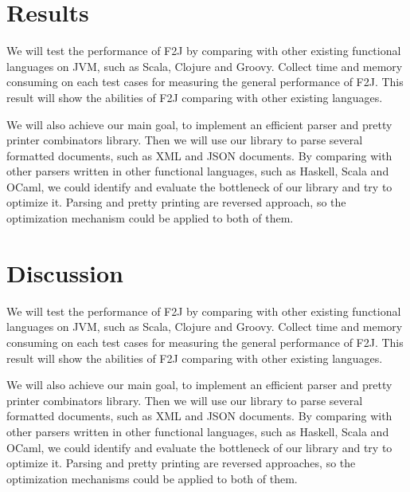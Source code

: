 \documentclass[9pt,a4paper,twocolumn]{article}
\begin{document}
\section{Results}

We will test the performance of F2J by comparing with other existing functional languages on JVM, such as Scala, Clojure and Groovy. Collect time and memory consuming on each test cases for measuring the general performance of F2J. This result will show the abilities of F2J comparing with other existing languages.

We will also achieve our main goal, to implement an efficient parser and pretty printer combinators library. Then we will use our library to parse several formatted documents, such as XML and JSON documents. By comparing with other parsers written in other functional languages, such as Haskell, Scala and OCaml, we could identify and evaluate the bottleneck of our library and try to optimize it. Parsing and pretty printing are reversed approach, so the optimization mechanism could be applied to both of them.

\section{Discussion}

We will test the performance of F2J by comparing with other existing functional languages on JVM, such as Scala, Clojure and Groovy. Collect time and memory consuming on each test cases for measuring the general performance of F2J. This result will show the abilities of F2J comparing with other existing languages.

We will also achieve our main goal, to implement an efficient parser and pretty printer combinators library. Then we will use our library to parse several formatted documents, such as XML and JSON documents. By comparing with other parsers written in other functional languages, such as Haskell, Scala and OCaml, we could identify and evaluate the bottleneck of our library and try to optimize it. Parsing and pretty printing are reversed approaches, so the optimization mechanisms could be applied to both of them.



\end{document}
